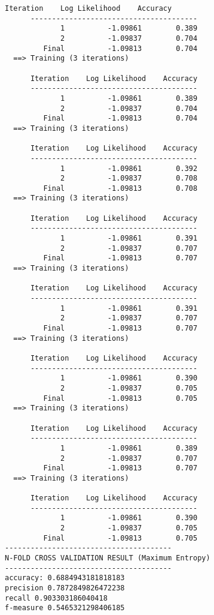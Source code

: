 \documentclass[11pt]{article}
\begin{document}
\begin{Verbatim}[commandchars=\\\{\}]
      Iteration    Log Likelihood    Accuracy
      ---------------------------------------
             1          -1.09861        0.389
             2          -1.09837        0.704
         Final          -1.09813        0.704
  ==> Training (3 iterations)

      Iteration    Log Likelihood    Accuracy
      ---------------------------------------
             1          -1.09861        0.389
             2          -1.09837        0.704
         Final          -1.09813        0.704
  ==> Training (3 iterations)

      Iteration    Log Likelihood    Accuracy
      ---------------------------------------
             1          -1.09861        0.392
             2          -1.09837        0.708
         Final          -1.09813        0.708
  ==> Training (3 iterations)

      Iteration    Log Likelihood    Accuracy
      ---------------------------------------
             1          -1.09861        0.391
             2          -1.09837        0.707
         Final          -1.09813        0.707
  ==> Training (3 iterations)

      Iteration    Log Likelihood    Accuracy
      ---------------------------------------
             1          -1.09861        0.391
             2          -1.09837        0.707
         Final          -1.09813        0.707
  ==> Training (3 iterations)

      Iteration    Log Likelihood    Accuracy
      ---------------------------------------
             1          -1.09861        0.390
             2          -1.09837        0.705
         Final          -1.09813        0.705
  ==> Training (3 iterations)

      Iteration    Log Likelihood    Accuracy
      ---------------------------------------
             1          -1.09861        0.389
             2          -1.09837        0.707
         Final          -1.09813        0.707
  ==> Training (3 iterations)

      Iteration    Log Likelihood    Accuracy
      ---------------------------------------
             1          -1.09861        0.390
             2          -1.09837        0.705
         Final          -1.09813        0.705
---------------------------------------
N-FOLD CROSS VALIDATION RESULT (Maximum Entropy)
---------------------------------------
accuracy: 0.6884943181818183
precision 0.7872849826472238
recall 0.903303186040418
f-measure 0.5465321298406185


    \end{Verbatim}


    
    
    
    
\end{document}
